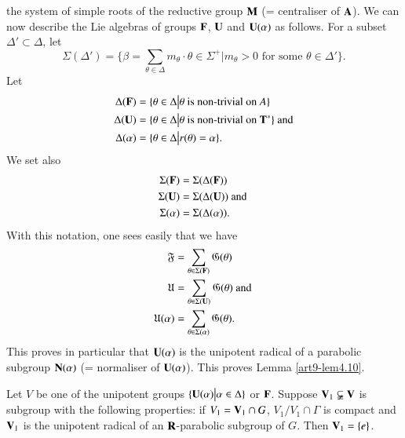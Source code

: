the system  of simple roots of the reductive group $\mathbf{M}$ (= centraliser of $\mathbf{A}$). We can now describe the Lie algebras of groups $\mathbf{F}$, $\mathbf{U}$ and $\mathbf{U} (\alpha)$ as follows. For a subset $\Delta' \subset \Delta$, let
$$
\Sigma (\Delta') = \{\beta = \sum\limits_{\theta \in \Delta} m_\theta  \cdot \theta \in \Sigma^+ \big| m_\theta > 0 \text{ for some } \theta \in \Delta'\}.
$$
Let 
\begin{align*}
\Delta (\mathbf{F}) & = \{\theta \in \Delta \big| \theta \text{ is non-trivial on } A \}\\
\Delta (\mathbf{U}) & = \{\theta \in \Delta \big| \theta \text{ is non-trivial on } \mathbf{T}^\ast\} \text{ and} \\
\Delta (\alpha) & = \{\theta \in \Delta \big| r (\theta) = \alpha \}.
\end{align*}
We set also 
\begin{align*}
\Sigma(\mathbf{F}) & = \Sigma (\Delta (\mathbf{F}))\\
\Sigma (\mathbf{U}) & = \Sigma (\Delta (\mathbf{U})) \text{ and }\\
\Sigma (\alpha) & = \Sigma (\Delta (\alpha)).
\end{align*}
With this notation, one sees easily that we have
\begin{align*}
\mathfrak{F} & = \sum\limits_{\theta \in \Sigma (\mathbf{F})} \mathfrak{G} (\theta) \\
\mathfrak{U} & = \sum\limits_{\theta \in \Sigma (\mathbf{U})} \mathfrak{G} (\theta) \text{ and }\\
\mathfrak{U}(\alpha) & =  \sum\limits_{\theta \in \Sigma (\alpha)} \mathfrak{G} (\theta).
\end{align*}
This proves in particular that $\mathbf{U}(\alpha)$ is the unipotent radical of a parabolic subgroup $\mathbf{N} (\alpha)$ (= normaliser of $\mathbf{U} (\alpha)$). This proves Lemma \ref{art9-lem4.10}.

\begin{lemma}\label{art9-lem4.12}
Let $V$ be one of the unipotent groups $\{\mathbf{U} (\alpha) \big| \alpha \in \Delta\}$ or $\mathbf{F}$. Suppose $\mathbf{V}_1 \varsubsetneqq \mathbf{V}$ is subgroup with the following properties: if $V_1 =\mathbf{V}_1 \cap G$, $V_1 / V_1 \cap \Gamma$ is compact and  $\mathbf{V}_1$ is the unipotent radical of an $\mathbf{R}$-parabolic subgroup of $G$. Then $\mathbf{V}_1 = \{e\}$.
\end{lemma}

